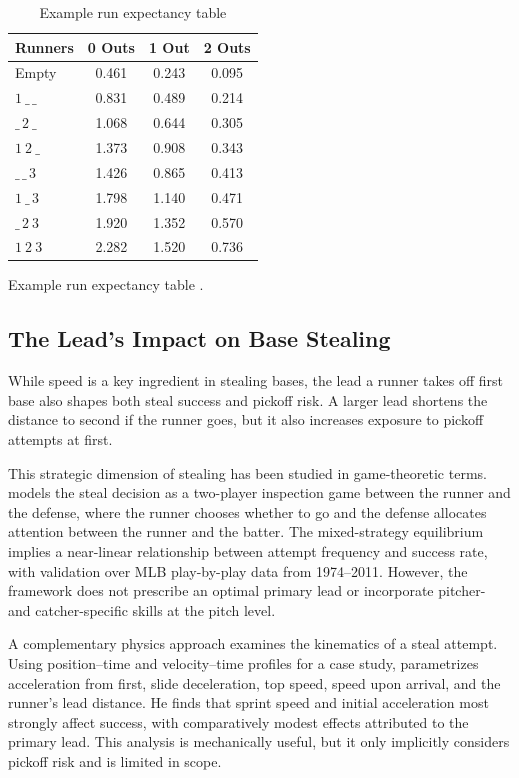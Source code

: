 \documentclass[12pt,letterpaper]{article}
\begin{document}
\begin{table}[htbp]
\centering
\caption{Example run expectancy table}
\label{tab:re24}
\begin{tabular}{l S S S}
\toprule
\textbf{Runners} & {\textbf{0 Outs}} & {\textbf{1 Out}} & {\textbf{2 Outs}}\\
\midrule
Empty   & 0.461 & 0.243 & 0.095 \\
$1\ \_\,\_$ & 0.831 & 0.489 & 0.214 \\
$\_\,2\ \_$ & 1.068 & 0.644 & 0.305 \\
$1\ 2\ \_$  & 1.373 & 0.908 & 0.343 \\
$\_\,\_\,3$ & 1.426 & 0.865 & 0.413 \\
$1\ \_\,3$  & 1.798 & 1.140 & 0.471 \\
$\_\,2\ 3$  & 1.920 & 1.352 & 0.570 \\
$1\ 2\ 3$   & 2.282 & 1.520 & 0.736 \\
\bottomrule
\end{tabular}

\vspace{0.25em}
\footnotesize Example run expectancy table \citep{FanGraphsRE24ND}.
\end{table}

\subsection{The Lead's Impact on Base Stealing}

While speed is a key ingredient in stealing bases, the lead a runner takes off first base also shapes both steal success and pickoff risk. A larger lead shortens the distance to second if the runner goes, but it also increases exposure to pickoff attempts at first.

This strategic dimension of stealing has been studied in game-theoretic terms. \citet{Turocy2014Theft} models the steal decision as a two-player inspection game between the runner and the defense, where the runner chooses whether to go and the defense allocates attention between the runner and the batter. The mixed-strategy equilibrium implies a near-linear relationship between attempt frequency and success rate, with validation over MLB play-by-play data from 1974--2011. However, the framework does not prescribe an optimal primary lead or incorporate pitcher- and catcher-specific skills at the pitch level.

A complementary physics approach examines the kinematics of a steal attempt. Using position--time and velocity--time profiles for a case study, \citet{Kagan2013StolenBasePhysics} parametrizes acceleration from first, slide deceleration, top speed, speed upon arrival, and the runner's lead distance. He finds that sprint speed and initial acceleration most strongly affect success, with comparatively modest effects attributed to the primary lead. This analysis is mechanically useful, but it only implicitly considers pickoff risk and is limited in scope.
\end{document}
